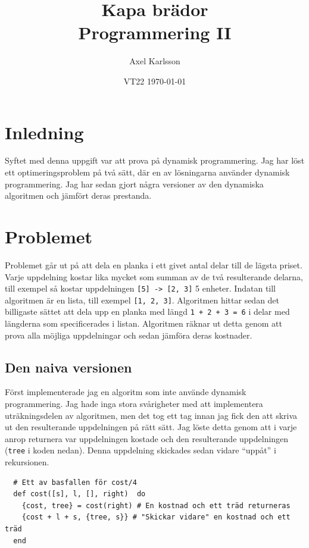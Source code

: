 \documentclass[a4paper,11pt]{article}
\begin{document}
\title{
  \textbf{Kapa brädor\\
  \small Programmering II}
}
\author{Axel Karlsson}
\date{VT22 \today}

\maketitle

\section*{Inledning}
Syftet med denna uppgift var att prova på dynamisk programmering. Jag har löst ett optimeringsproblem på två sätt, där en av lösningarna använder dynamisk programmering. Jag har sedan gjort några versioner av den dynamiska algoritmen och jämfört deras prestanda.

\section*{Problemet}
Problemet går ut på att dela en planka i ett givet antal delar till de lägsta priset. Varje uppdelning kostar lika mycket som summan av de två resulterande delarna, till exempel så kostar uppdelningen {\tt [5] -> [2, 3]} 5 enheter. Indatan till algoritmen är en lista, till exempel {\tt [1, 2, 3]}. Algoritmen hittar sedan det billigaste sättet att dela upp en planka med längd {\tt 1 + 2 + 3 = 6} i delar med längderna som specificerades i listan. Algoritmen räknar ut detta genom att prova alla möjliga uppdelningar och sedan jämföra deras kostnader.

\subsection*{Den naiva versionen}
Först implementerade jag en algoritm som inte använde dynamisk programmering. Jag hade inga stora svårigheter med att implementera uträkningsdelen av algoritmen, men det tog ett tag innan jag fick den att skriva ut den resulterande uppdelningen på rätt sätt. Jag löste detta genom att i varje anrop returnera var uppdelningen kostade och den resulterande uppdelningen ({\tt tree} i koden nedan). Denna uppdelning skickades sedan vidare ``uppåt'' i rekursionen.
\begin{verbatim}
  # Ett av basfallen för cost/4
  def cost([s], l, [], right)  do
    {cost, tree} = cost(right) # En kostnad och ett träd returneras
    {cost + l + s, {tree, s}} # "Skickar vidare" en kostnad och ett träd
  end
\end{verbatim}
\end{document}
